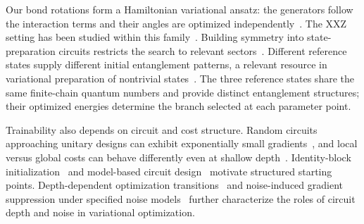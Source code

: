 Our bond rotations form a Hamiltonian variational ansatz: the generators follow the interaction terms and their angles are optimized independently~\cite{wecker2015progress}.
The XXZ setting has been studied within this family~\cite{wiersema2020exploring}.
Building symmetry into state-preparation circuits restricts the search to relevant sectors~\cite{gard2020efficient}.
Different reference states supply different initial entanglement patterns, a relevant resource in variational preparation of nontrivial states~\cite{ho2019efficient}.
The three reference states share the same finite-chain quantum numbers and provide distinct entanglement structures; their optimized energies determine the branch selected at each parameter point.

Trainability also depends on circuit and cost structure.
Random circuits approaching unitary designs can exhibit exponentially small gradients~\cite{mcclean2018barren}, and local versus global costs can behave differently even at shallow depth~\cite{cerezo2021cost}.
Identity-block initialization~\cite{grant2019initialization} and model-based circuit design~\cite{wiersema2020exploring} motivate structured starting points.
Depth-dependent optimization transitions~\cite{campos2021abrupt} and noise-induced gradient suppression under specified noise models~\cite{wang2021noise} further characterize the roles of circuit depth and noise in variational optimization.

